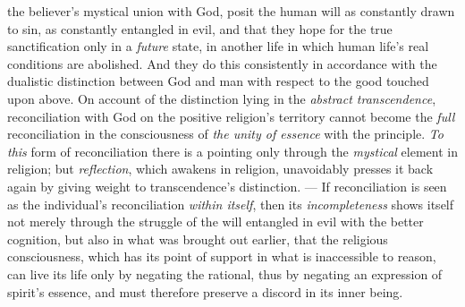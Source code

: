 \documentclass[12pt,a4paper]{book}
\begin{document}
the believer's mystical union with God, posit the human will as constantly drawn
to sin, as constantly entangled in evil, and that they hope for the true
sanctification only in a \emph{future} state, in another life in which human
life's real conditions are abolished. And they do this consistently in
accordance with the dualistic distinction between God and man with respect to
the good touched upon above. On account of the distinction lying in the
\emph{abstract transcendence}, reconciliation with God on the positive
religion's territory cannot become the \emph{full} reconciliation in the
consciousness of \emph{the unity of essence} with the principle. \emph{To this}
form of reconciliation there is a pointing only through the \emph{mystical}
element in religion; but \emph{reflection}, which awakens in religion,
unavoidably presses it back again by giving weight to transcendence's
distinction. --- If reconciliation is seen as the individual's reconciliation
\emph{within itself}, then its \emph{incompleteness} shows itself not merely
through the struggle of the will entangled in evil with the better cognition,
but also in what was brought out earlier, that the religious consciousness,
which has its point of support in what is inaccessible to reason, can live its
life only by negating the rational, thus by negating an expression of spirit's
essence, and must therefore preserve a discord in its inner being.
\end{document}
